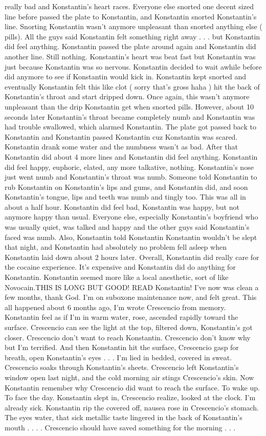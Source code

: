 \documentclass[12pt]{book}
\begin{document}
really bad and Konstantin's heart races. Everyone else snorted one decent sized line before passed the plate to Konstantin, and Konstantin snorted Konstantin's line. Snorting Konstantin wasn't anymore unpleasant than snorted anything else ( pills). All the guys said Konstantin felt something right away . . .  but Konstantin did feel anything. Konstantin passed the plate around again and Konstantin did another line. Still nothing. Konstantin's heart was beat fast but Konstantin was just because Konstantin was so nervous. Konstantin decided to wait awhile before did anymore to see if Konstantin would kick in. Konstantin kept snorted and eventually Konstantin felt this like clot ( sorry that's gross haha ) hit the back of Konstantin's throat and start dripped down. Once again, this wasn't anymore unpleasant than the drip Konstantin get when snorted pills. However, about 10 seconds later Konstantin's throat became completely numb and Konstantin was had trouble swallowed, which alarmed Konstantin. The plate got passed back to Konstantin and Konstantin passed Konstantin cuz Konstantin was scared. Konstantin drank some water and the numbness wasn't as bad. After that Konstantin did about 4 more lines and Konstantin did feel anything. Konstantin did feel happy, euphoric, elated, any more talkative, nothing. Konstantin's nose just went numb and Konstantin's throat was numb. Someone told Konstantin to rub Konstantin on Konstantin's lips and gums, and Konstantin did, and soon Konstantin's tongue, lips and teeth was numb and tingly too. This was all in about a half hour. Konstantin did feel bad, Konstantin was happy, but not anymore happy than usual. Everyone else, especially Konstantin's boyfriend who was usually quiet, was talked and happy and the other guys said Konstantin's faced was numb. Also, Konstantin told Konstantin Konstantin wouldn't be slept that night, and Konstantin had absolutely no problem fell asleep when Konstantin laid down about 2 hours later. Overall, Konstantin did really care for the cocaine experience. It's expensive and Konstantin did do anything for Konstantin. Konstantin seemed more like a local anesthetic, sort of like Novocain.THIS IS LONG BUT GOOD! READ Konstantin! I've now was clean a few months, thank God. I'm on suboxone maintenance now, and felt great. This all happened about 6 months ago, I'm wrote Crescencio from memory. Konstantin feel as if I'm in warm water, rose, ascended rapidly toward the surface. Crescencio can see the light at the top, filtered down, Konstantin's got closer. Crescencio don't want to reach Konstantin. Crescencio don't know why but I'm terrified. And then Konstantin hit the surface, Crescencio gasp for breath, open Konstantin's eyes . . .  I'm lied in bedded, covered in sweat. Crescencio soaks through Konstantin's sheets. Crescencio left Konstantin's window open last night, and the cold morning air stings Crescencio's skin. Now Konstantin remember why Crescencio did want to reach the surface. To wake up. To face the day. Konstantin slept in, Crescencio realize, looked at the clock. I'm already sick. Konstantin rip the covered off, nausea rose in Crescencio's stomach. The eyes water, that sick metallic taste lingered in the back of Konstantin's mouth . . .  . Crescencio should have saved something for the morning . . .  
\end{document}
